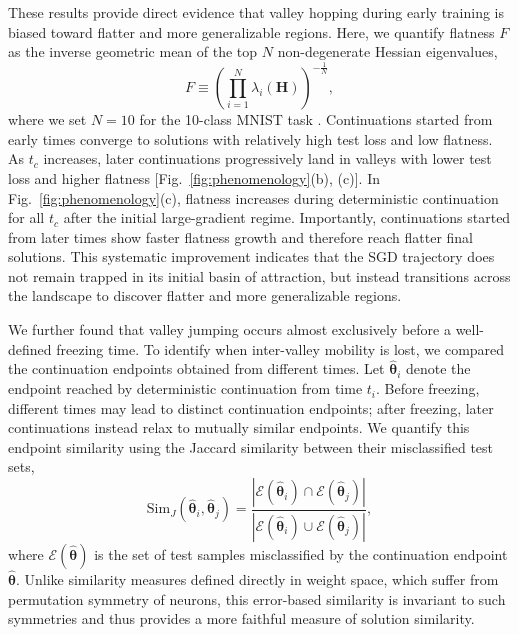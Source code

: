 \documentclass[aps,prx,reprint,superscriptaddress,longbibliography,nofootinbib,floatfix]{revtex4-2}
\begin{document}
These results provide direct evidence that valley hopping during early training is biased toward flatter and more generalizable regions. Here, we quantify flatness $F$ as the inverse geometric mean of the top $N$ non-degenerate Hessian eigenvalues,
\begin{equation}
F \equiv \left( \prod_{i=1}^{N} \lambda_i(\mathbf{H}) \right)^{-\tfrac{1}{N}},
\label{eq}
\end{equation}
where we set $N=10$ for the 10-class MNIST task \cite{sagunEmpiricalAnalysisHessian2018a}. Continuations started from early times converge to solutions with relatively high test loss and low flatness. As $t_c$ increases, later continuations progressively land in valleys with lower test loss and higher flatness [Fig.~\ref{fig:phenomenology}(b), (c)]. In Fig.~\ref{fig:phenomenology}(c), flatness increases during deterministic continuation for all $t_c$ after the initial large-gradient regime. Importantly, continuations started from later times show faster flatness growth and therefore reach flatter final solutions. This systematic improvement indicates that the SGD trajectory does not remain trapped in its initial basin of attraction, but instead transitions across the landscape to discover flatter and more generalizable regions. 

We further found that valley jumping occurs almost exclusively before a well-defined freezing time. To identify when inter-valley mobility is lost, we compared the continuation endpoints obtained from different times. Let $\hat{\bm{\theta}}_i$ denote the endpoint reached by deterministic continuation from time $t_i$. Before freezing, different times may lead to distinct continuation endpoints; after freezing, later continuations instead relax to mutually similar endpoints.
We quantify this endpoint similarity using the Jaccard similarity between their misclassified test sets,
\begin{equation}
    \mathrm{Sim}_J(\hat{\bm{\theta}}_i,\hat{\bm{\theta}}_j)
    =
    \frac{|\mathcal{E}(\hat{\bm{\theta}}_i)\cap\mathcal{E}(\hat{\bm{\theta}}_j)|}
    {|\mathcal{E}(\hat{\bm{\theta}}_i)\cup\mathcal{E}(\hat{\bm{\theta}}_j)|},
    \label{eq:jaccard_similarity}
\end{equation}
where $\mathcal{E}(\hat{\bm{\theta}})$ is the set of test samples misclassified by the continuation endpoint $\hat{\bm{\theta}}$. Unlike similarity measures defined directly in weight space, which suffer from permutation symmetry of neurons, this error-based similarity is invariant to such symmetries and thus provides a more faithful measure of solution similarity.
\end{document}
